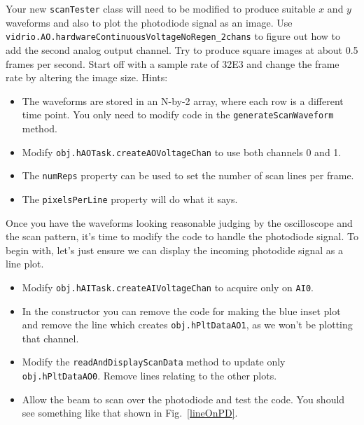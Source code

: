 \documentclass[a4paper]{report}
\begin{document}
\noindent
Your new \texttt{scanTester} class will need to be modified to produce suitable $x$ and $y$ waveforms and also to plot the photodiode signal as an image. 
Use \texttt{vidrio.AO.hardwareContinuousVoltageNoRegen\_2chans} to figure out how to add the second analog output channel.
Try to produce square images at about 0.5 frames per second. 
Start off with a sample rate of 32E3 and change the frame rate by altering the image size.
Hints:
\begin{itemize}
    \setlength\itemsep{0.15em}
    \item The waveforms are stored in an N-by-2 array, where each row is a different time point. You only need to modify code in the \texttt{generateScanWaveform} method.
    \item Modify \texttt{obj.hAOTask.createAOVoltageChan} to use both channels 0 and 1.
    \item The \texttt{numReps} property can be used to set the number of scan lines per frame.
    \item The \texttt{pixelsPerLine} property will do what it says. 
\end{itemize}

\noindent

Once you have the waveforms looking reasonable judging by the oscilloscope and the scan pattern, it's time to modify the code to handle the photodiode signal. 
To begin with, let's just ensure we can display the incoming photodide signal as a line plot.

\begin{itemize}
    \setlength\itemsep{0.15em}
    \item Modify \texttt{obj.hAITask.createAIVoltageChan} to acquire only on \texttt{AI0}.
    \item In the constructor you can remove the code for making the blue inset plot and remove the line which creates \texttt{obj.hPltDataAO1}, as we won't be plotting that channel.
    \item Modify the \texttt{readAndDisplayScanData} method to update only \texttt{obj.hPltDataAO0}. Remove lines relating to the other plots. 
    \item Allow the beam to scan over the photodiode and test the code. 
    You should see something like that shown in Fig.~\ref{lineOnPD}. 
\end{itemize}

\noindent
\end{document}
